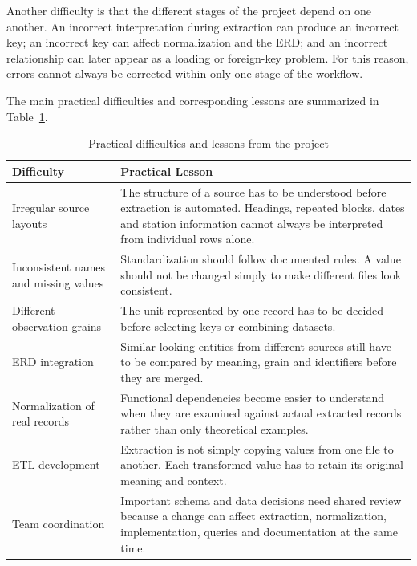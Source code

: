 Another difficulty is that the different stages of the project depend on one
another. An incorrect interpretation during extraction can produce an
incorrect key; an incorrect key can affect normalization and the ERD; and an
incorrect relationship can later appear as a loading or foreign-key problem.
For this reason, errors cannot always be corrected within only one stage of the
workflow.

The main practical difficulties and corresponding lessons are summarized in
Table~\ref{tab:course-practical-lessons}.

\begin{table}[!htbp]
\centering
\caption{Practical difficulties and lessons from the project}
\label{tab:course-practical-lessons}
\setlength{\tabcolsep}{6pt}
\renewcommand{\arraystretch}{1.22}
\begin{tabular}{p{4.3cm}p{9.5cm}}
\toprule
\textbf{Difficulty} & \textbf{Practical Lesson} \\
\midrule
Irregular source layouts & The structure of a source has to be understood
before extraction is automated. Headings, repeated blocks, dates and station
information cannot always be interpreted from individual rows alone. \\
Inconsistent names and missing values & Standardization should follow
documented rules. A value should not be changed simply to make different files
look consistent. \\
Different observation grains & The unit represented by one record has to be
decided before selecting keys or combining datasets. \\
ERD integration & Similar-looking entities from different sources still have
to be compared by meaning, grain and identifiers before they are merged. \\
Normalization of real records & Functional dependencies become easier to
understand when they are examined against actual extracted records rather than
only theoretical examples. \\
ETL development & Extraction is not simply copying values from one file to
another. Each transformed value has to retain its original meaning and context. \\
Team coordination & Important schema and data decisions need shared review
because a change can affect extraction, normalization, implementation, queries
and documentation at the same time. \\
\bottomrule
\end{tabular}
\end{table}

